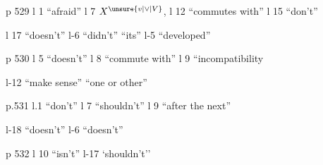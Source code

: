p 529 l 1 ``afraid'' \quad l 7 $X^{\unsure{v|\vee|V}}$, \quad l 12 ``commutes with'' \quad l 15 ``don't''

l 17 ``doesn't'' \quad l-6 ``didn't'' ``its'' \quad l-5 ``developed''

p 530 l 5 ``doesn't'' \quad l 8 ``commute with'' \quad l 9 ``incompatibility

l-12 ``make sense'' ``one or other''

p.531 l.1 ``don't'' \quad l 7 ``shouldn't'' \quad l 9 ``after the next''

l-18 ``doesn't'' \quad l-6 ``doesn't''

p 532 l 10 ``isn't'' \quad l-17 `shouldn't'' \quad {}


